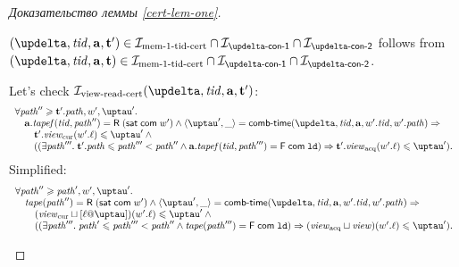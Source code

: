 \begin{proof}[Доказательство леммы \ref{cert-lem-one}]
\begin{itemize}
      $(\delta, \tId, \aT, \tT') \in \invMemZeroCERT \cap \invDeltaDefOne \cap \invDeltaDefTwo$ follows from
      $(\delta, \tId, \aT, \tT) \in \invMemZeroCERT \cap \invDeltaDefOne \cap \invDeltaDefTwo$.
      
      Let's check $\invViewReadCERT(\delta, \tId, \aT, \tT')$:
      \[\begin{array}{l}
  \forall \cpath'' \ge \tT'.\cpath, \w', \tau'. \\
\quad \aT.\tapef(\tId, \cpath'') = \tapeRead{(\tapeSatisfied{\Committed}{\w'})} \land
   \angled{\tau', \_} = \deltaHmap(\delta, \tId, \aT, \w'.\tId, \w'.\cpath) \Rightarrow \\
\qquad \tT'.\Rcur(\w'.\loc) \le \tau' \land {} \\
\qquad ((\exists \cpath'''. \; \tT'.\cpath \le \cpath''' < \cpath'' \land 
             \aT.\tapef(\tId, \cpath''') = \tapeFence{\Committed}{\LD}) \Rightarrow \tT'.\Racq(\w'.\loc) \le \tau'). \\
      \end{array}\]
      Simplified:
      \[\begin{array}{l}
  \forall \cpath'' \ge \cpath', \w', \tau'. \\
\quad \tape(\cpath'') = \tapeRead{(\tapeSatisfied{\Committed}{\w'})} \land
   \angled{\tau', \_} = \deltaHmap(\delta, \tId, \aT, \w'.\tId, \w'.\cpath) \Rightarrow \\
\qquad (\Rcur \sqcup [\loc @ \tau])(\w'.\loc) \le \tau' \land {} \\
\qquad ((\exists \cpath'''. \; \cpath' \le \cpath''' < \cpath'' \land 
             \tape(\cpath''') = \tapeFence{\Committed}{\LD}) \Rightarrow (\Racq \sqcup \R)(\w'.\loc) \le \tau'). \\
      \end{array}\]
      

\end{itemize}
\end{proof}

